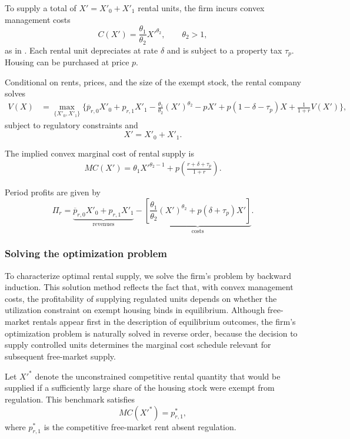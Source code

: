 \documentclass[parskip=full]{article}
\begin{document}
To supply a total of $X' = X'_0 + X'_1$ rental units, the firm incurs convex management costs
\[C(X') = \frac{\theta_1}{\theta_2} X'^{\theta_2}, \qquad \theta_2 > 1,\]
as in \citet{garrigaeetal-2009}. Each rental unit depreciates at rate $\delta$ and is subject to a property tax $\tau_p$. Housing can be purchased at price $p$.

Conditional on rents, prices, and the size of the exempt stock, the rental company solves
\begin{align}\label{eq:rental_optimization}
V(X) &= \max_{\{X'_0, X'_1\}} \Big\{\overline{p}_{r,0} X'_0 + p_{r,1} X'_1- \frac{\theta_1}{\theta_2} (X')^{\theta_2}- p X' + p(1-\delta-\tau_p) X+ \frac{1}{1+r} V(X')\Big\},
\end{align}
subject to regulatory constraints and
\[X' = X'_0 + X'_1.\]

\noindent The implied convex marginal cost of rental supply is
\begin{align}\label{eq:rental_MC}
MC(X') = \theta_1 X'^{\theta_2 - 1}+ p\left(\frac{r + \delta + \tau_p}{1+r}\right).
\end{align}

Period profits are given by
\[\Pi_r=\underbrace{\overline{p}_{r,0} X'_0 + p_{r,1} X'_1}_{\text{revenues}}-\underbrace{\left[\frac{\theta_1}{\theta_2} (X')^{\theta_2}+ p(\delta + \tau_p) X'\right]}_{\text{costs}}.\]

\subsubsection*{Solving the optimization problem}

To characterize optimal rental supply, we solve the firm’s problem by backward induction. This solution method reflects the fact that, with convex management costs, the profitability of supplying regulated units depends on whether the utilization constraint on exempt housing binds in equilibrium. Although free-market rentals appear first in the description of equilibrium outcomes, the firm’s optimization problem is naturally solved in reverse order, because the decision to supply controlled units determines the marginal cost schedule relevant for subsequent free-market supply.

Let $X'^*$ denote the unconstrained competitive rental quantity that would be supplied if a sufficiently large share of the housing stock were exempt from regulation. This benchmark satisfies
\[MC(X'^*) = p_{r,1}^*,\]
\noindent where $p_{r,1}^*$ is the competitive free-market rent absent regulation.
\end{document}
